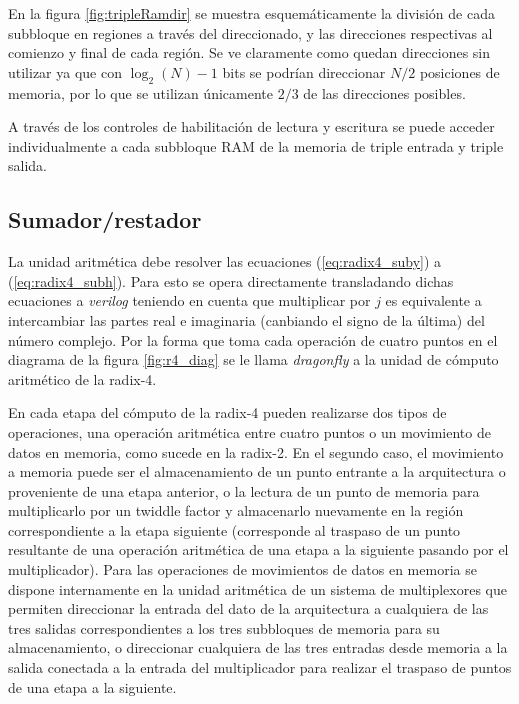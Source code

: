 En la figura \ref{fig:tripleRamdir} se muestra esquemáticamente la división de cada subbloque en
regiones a través del direccionado, y las direcciones respectivas al comienzo y final de cada
región. Se ve claramente como quedan direcciones sin utilizar ya que con $\log_2(N)-1$ bits se
podrían direccionar $N/2$ posiciones de memoria, por lo que se utilizan únicamente $2/3$ de las
direcciones posibles.

A través de los controles de habilitación de lectura y escritura se puede acceder individualmente a
cada subbloque RAM de la memoria de triple entrada y triple salida.

\subsection{Sumador/restador}

La unidad aritmética debe resolver las ecuaciones (\ref{eq:radix4_suby}) a (\ref{eq:radix4_subh}).
Para esto se opera directamente transladando dichas ecuaciones a \textit{verilog} teniendo en cuenta
que multiplicar por $j$ es equivalente a intercambiar las partes real e imaginaria (canbiando el
signo de la última) del número complejo. Por la forma que toma cada operación de cuatro puntos en el
diagrama de la figura \ref{fig:r4_diag} se le llama \textit{dragonfly} a la unidad de cómputo
aritmético de la radix-4.

En cada etapa del cómputo de la radix-4 pueden realizarse dos tipos de operaciones, una operación
aritmética entre cuatro puntos o un movimiento de datos en memoria, como sucede en la radix-2. En el
segundo caso, el movimiento a memoria puede ser el almacenamiento de un punto entrante a la arquitectura o
proveniente de una etapa anterior, o la lectura de un punto de memoria para multiplicarlo por un
twiddle factor y almacenarlo nuevamente en la región correspondiente a la etapa siguiente
(corresponde al traspaso de un punto resultante de una operación aritmética de una etapa a la
siguiente pasando por el multiplicador). 
Para las operaciones de movimientos de datos en memoria se
dispone internamente en la unidad aritmética de un sistema de multiplexores que permiten direccionar
la entrada del dato de la arquitectura a cualquiera de las tres salidas correspondientes a los tres
subbloques de memoria para su almacenamiento, o direccionar cualquiera de las tres entradas desde
memoria a la salida conectada a la entrada del multiplicador para realizar el traspaso de puntos de
una etapa a la siguiente.

